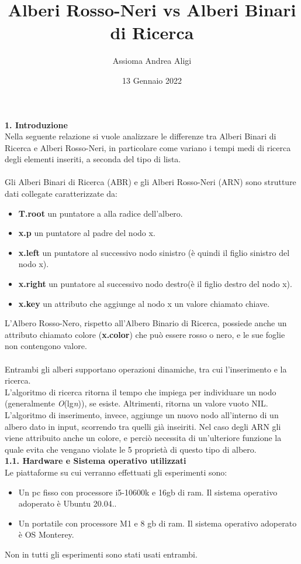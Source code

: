 \documentclass[]{article}
\begin{document}
\title{\textbf{Alberi Rosso-Neri vs Alberi Binari di Ricerca}}
\author{Assioma Andrea Aligi}
\date{13 Gennaio 2022}
\maketitle

{\Large \textbf{1. Introduzione}}\\
Nella seguente relazione si vuole analizzare le differenze tra Alberi Binari di Ricerca e Alberi Rosso-Neri, 
in particolare come variano i tempi medi di ricerca degli elementi inseriti, a seconda del tipo di lista. \\
\\
Gli Alberi Binari di Ricerca (ABR) e gli Alberi Rosso-Neri (ARN) sono strutture dati collegate caratterizzate da:
\begin{itemize}
    \item \textbf{T.root} un puntatore a alla radice dell'albero.
    \item \textbf{x.p} un puntatore al padre del nodo x.
    \item \textbf{x.left} un puntatore al successivo nodo sinistro (è quindi il figlio sinistro del nodo x).
    \item \textbf{x.right} un puntatore al successivo nodo destro(è il figlio destro del nodo x).
    \item \textbf{x.key} un attributo che aggiunge al nodo x un valore chiamato chiave.
\end{itemize}
L'Albero Rosso-Nero, rispetto all'Albero Binario di Ricerca, possiede anche un attributo chiamato colore (\textbf{x.color}) che può essere rosso o nero, e le sue foglie non contengono valore.\\
\\
Entrambi gli alberi supportano operazioni dinamiche, tra cui l'inserimento e la ricerca.\\
L'algoritmo di ricerca ritorna il tempo che impiega per individuare un nodo (generalmente \textit{O}(lg\textit{n})), se esiste. Altrimenti, ritorna un valore vuoto NIL.\\
L'algoritmo di inserimento, invece, aggiunge un nuovo nodo all'interno di un albero dato in input, scorrendo tra quelli già inseiriti. 
Nel caso degli ARN gli viene attribuito anche un colore, 
e perciò necessita di un'ulteriore funzione la quale evita che vengano violate le 5 proprietà di questo tipo di albero.\\

\newpage
{\Large \textbf{{\Large{1}}.{\small{1}}. Hardware e Sistema operativo utilizzati}}\\
Le piattaforme su cui verranno effettuati gli esperimenti sono:
\begin{itemize}
  \item Un pc fisso con processore i5-10600k e 16gb di ram. Il sistema operativo adoperato è Ubuntu 20.04..
  \item Un portatile con processore M1 e 8 gb di ram. Il sistema operativo adoperato è OS Monterey.
\end{itemize}
Non in tutti gli esperimenti sono stati usati entrambi.\\
\end{document}
